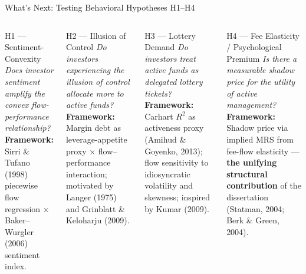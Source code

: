 \documentclass[aspectratio=169,10pt]{beamer}
\begin{document}
\begin{frame}{What's Next: Testing Behavioral Hypotheses H1--H4}
\begin{columns}[T]
{\small
\begin{block}{H1 — Sentiment-Convexity}
\textit{Does investor sentiment amplify the convex flow-performance relationship?}\\[3pt]
\textbf{Framework:} Sirri \& Tufano (1998) piecewise flow regression $\times$ Baker--Wurgler (2006) sentiment index.
\end{block}

\vspace{3pt}

\begin{block}{H2 — Illusion of Control}
\textit{Do investors experiencing the illusion of control allocate more to active funds?}\\[3pt]
\textbf{Framework:} Margin debt as leverage-appetite proxy $\times$ flow--performance interaction; motivated by Langer (1975) and Grinblatt \& Keloharju (2009).
\end{block}
}

{\small
\begin{block}{H3 — Lottery Demand}
\textit{Do investors treat active funds as delegated lottery tickets?}\\[3pt]
\textbf{Framework:} Carhart $R^2$ as activeness proxy (Amihud \& Goyenko, 2013); flow sensitivity to idiosyncratic volatility and skewness; inspired by Kumar (2009).
\end{block}

\vspace{3pt}

\begin{block}{H4 — Fee Elasticity / Psychological Premium}
\textit{Is there a measurable \emph{shadow price} for the utility of active management?}\\[3pt]
\textbf{Framework:} Shadow price via implied MRS from fee-flow elasticity — \textbf{the unifying structural contribution} of the dissertation (Statman, 2004; Berk \& Green, 2004).
\end{block}
}

\end{columns}
\end{frame}
\end{document}
